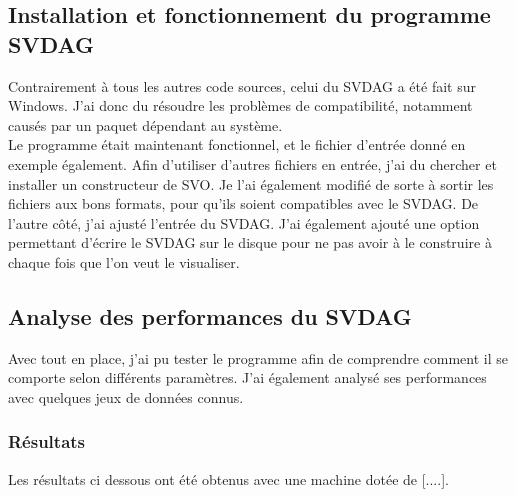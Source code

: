 \documentclass[12pt,a4paper,twoside]{article}
\begin{document}
    \subsection{Installation et fonctionnement du programme SVDAG}

    Contrairement à tous les autres code sources, celui du SVDAG a été fait sur Windows. J'ai donc du résoudre les problèmes
    de compatibilité, notamment causés par un paquet dépendant au système. \\
    Le programme était maintenant fonctionnel, et le fichier d'entrée donné en exemple également.
    Afin d'utiliser d'autres fichiers en entrée, j'ai du chercher et installer un constructeur de SVO. Je l'ai également
    modifié de sorte à sortir les fichiers aux bons formats, pour qu'ils soient compatibles avec le SVDAG.
    De l'autre côté, j'ai ajusté l'entrée du SVDAG. J'ai également ajouté une option permettant d'écrire le SVDAG sur
    le disque pour ne pas avoir à le construire à chaque fois que l'on veut le visualiser.


    \subsection{Analyse des performances du SVDAG}

    Avec tout en place, j'ai pu tester le programme afin de comprendre comment il se comporte selon différents
    paramètres. J'ai également analysé ses performances avec quelques jeux de données connus.

    \subsubsection{Résultats}

    Les résultats ci dessous ont été obtenus avec une machine dotée de [....].
\end{document}
